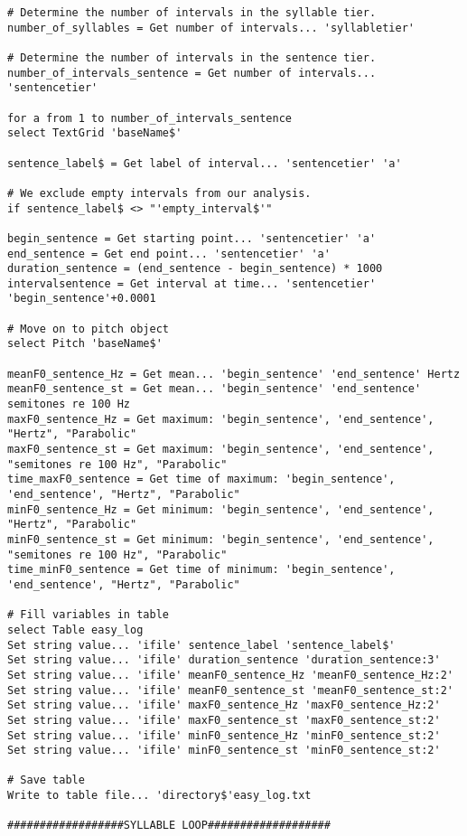 \begin{Verbatim}[fontsize=\tiny]
# Determine the number of intervals in the syllable tier.
number_of_syllables = Get number of intervals... 'syllabletier'

# Determine the number of intervals in the sentence tier.
number_of_intervals_sentence = Get number of intervals... 'sentencetier'

for a from 1 to number_of_intervals_sentence
select TextGrid 'baseName$'

sentence_label$ = Get label of interval... 'sentencetier' 'a'

# We exclude empty intervals from our analysis. 
if sentence_label$ <> "'empty_interval$'"

begin_sentence = Get starting point... 'sentencetier' 'a'
end_sentence = Get end point... 'sentencetier' 'a'
duration_sentence = (end_sentence - begin_sentence) * 1000
intervalsentence = Get interval at time... 'sentencetier' 'begin_sentence'+0.0001

# Move on to pitch object 
select Pitch 'baseName$'

meanF0_sentence_Hz = Get mean... 'begin_sentence' 'end_sentence' Hertz
meanF0_sentence_st = Get mean... 'begin_sentence' 'end_sentence' semitones re 100 Hz
maxF0_sentence_Hz = Get maximum: 'begin_sentence', 'end_sentence', "Hertz", "Parabolic"
maxF0_sentence_st = Get maximum: 'begin_sentence', 'end_sentence', "semitones re 100 Hz", "Parabolic"
time_maxF0_sentence = Get time of maximum: 'begin_sentence', 'end_sentence', "Hertz", "Parabolic"
minF0_sentence_Hz = Get minimum: 'begin_sentence', 'end_sentence', "Hertz", "Parabolic"
minF0_sentence_st = Get minimum: 'begin_sentence', 'end_sentence', "semitones re 100 Hz", "Parabolic"
time_minF0_sentence = Get time of minimum: 'begin_sentence', 'end_sentence', "Hertz", "Parabolic"

# Fill variables in table
select Table easy_log
Set string value... 'ifile' sentence_label 'sentence_label$'
Set string value... 'ifile' duration_sentence 'duration_sentence:3'
Set string value... 'ifile' meanF0_sentence_Hz 'meanF0_sentence_Hz:2'
Set string value... 'ifile' meanF0_sentence_st 'meanF0_sentence_st:2'
Set string value... 'ifile' maxF0_sentence_Hz 'maxF0_sentence_Hz:2'
Set string value... 'ifile' maxF0_sentence_st 'maxF0_sentence_st:2'
Set string value... 'ifile' minF0_sentence_Hz 'minF0_sentence_st:2'
Set string value... 'ifile' minF0_sentence_st 'minF0_sentence_st:2'

# Save table
Write to table file... 'directory$'easy_log.txt

##################SYLLABLE LOOP###################


\end{Verbatim}
